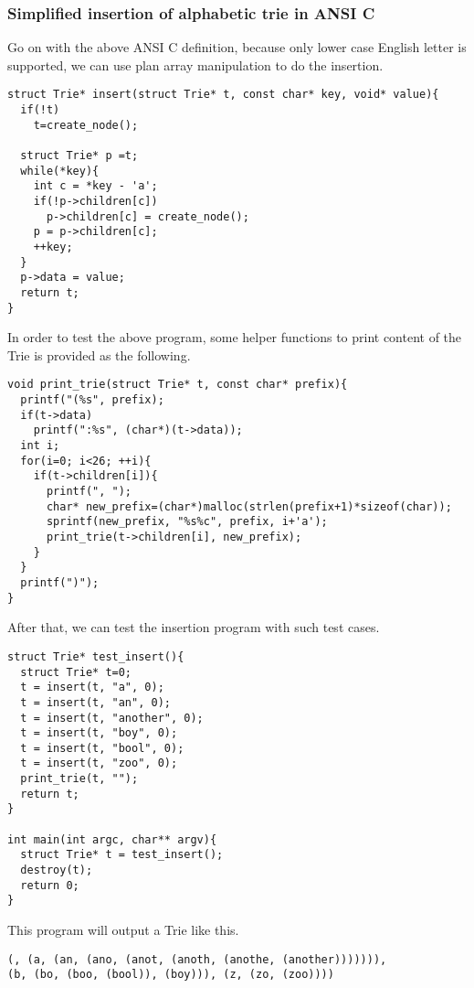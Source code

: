 \documentclass{article}
\begin{document}
\subsubsection*{Simplified insertion of alphabetic trie in ANSI C}
Go on with the above ANSI C definition, because only lower case 
English letter is supported, we can use plan array manipulation
to do the insertion.

\lstset{language=C}
\begin{lstlisting}
struct Trie* insert(struct Trie* t, const char* key, void* value){
  if(!t)
    t=create_node();

  struct Trie* p =t;
  while(*key){
    int c = *key - 'a';
    if(!p->children[c])
      p->children[c] = create_node();
    p = p->children[c];
    ++key;
  }
  p->data = value;
  return t;
}
\end{lstlisting}

In order to test the above program, some helper functions
to print content of the Trie is provided as the following.

\begin{lstlisting}
void print_trie(struct Trie* t, const char* prefix){
  printf("(%s", prefix);
  if(t->data)
    printf(":%s", (char*)(t->data));
  int i;
  for(i=0; i<26; ++i){
    if(t->children[i]){
      printf(", ");
      char* new_prefix=(char*)malloc(strlen(prefix+1)*sizeof(char));
      sprintf(new_prefix, "%s%c", prefix, i+'a');
      print_trie(t->children[i], new_prefix);
    }
  }
  printf(")");
}
\end{lstlisting}

After that, we can test the insertion program with such test
cases.
                                   
\begin{lstlisting}
struct Trie* test_insert(){
  struct Trie* t=0;
  t = insert(t, "a", 0);
  t = insert(t, "an", 0);
  t = insert(t, "another", 0);
  t = insert(t, "boy", 0);
  t = insert(t, "bool", 0);
  t = insert(t, "zoo", 0);
  print_trie(t, "");
  return t;
}

int main(int argc, char** argv){
  struct Trie* t = test_insert();
  destroy(t);
  return 0;
}
\end{lstlisting}

This program will output a Trie like this.

\begin{verbatim}
(, (a, (an, (ano, (anot, (anoth, (anothe, (another))))))), 
(b, (bo, (boo, (bool)), (boy))), (z, (zo, (zoo))))
\end{verbatim}
\end{document}
